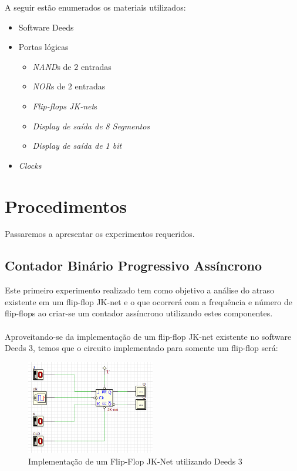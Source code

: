 \documentclass[12pt]{article}
\begin{document}
A seguir estão enumerados os materiais utilizados:
\begin{itemize}
    \item Software Deeds
    \item Portas lógicas
    \begin{itemize}
      \item \emph{NAND}s de $2$ entradas
      \item \emph{NOR}s de $2$ entradas
      \item \emph{Flip-flops JK-net}s
      \item \emph{Display de saída de 8 Segmentos}
      \item \emph{Display de saída de 1 bit}
    \end{itemize}
    \item \emph{Clocks}
\end{itemize}

\section{Procedimentos}\label{sec:Procedimentos}

Passaremos a apresentar os experimentos requeridos.

\subsection{Contador Binário Progressivo Assíncrono}\label{sec:2.1}

Este primeiro experimento realizado tem como objetivo a análise do atraso
existente em um flip-flop JK-net e o que ocorrerá com a frequência e número de
flip-flops ao criar-se um contador assíncrono utilizando estes componentes.\\ \\
Aproveitando-se da implementação de um flip-flop JK-net existente no software
Deeds 3, temos que o circuito implementado para somente um flip-flop será:

\begin{figure}[H]
  \centering
  \includegraphics[width=0.5\textwidth]{Exp09/images/2.1.1.png}
  \caption{Implementação de um Flip-Flop JK-Net utilizando Deeds 3}\label{fig:2.1.1.png}
\end{figure}
\end{document}
